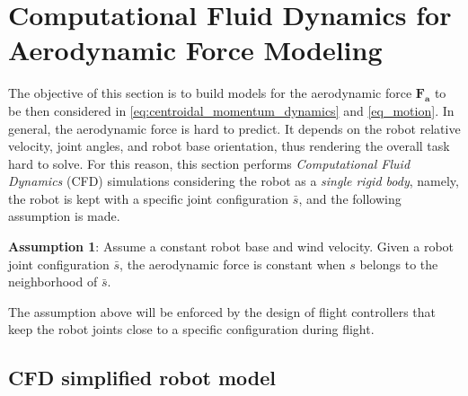 \section{Computational Fluid Dynamics for Aerodynamic Force Modeling}
\label{methods}
The objective of this section is to build models for the aerodynamic force $\boldsymbol{F_a}$ to be then considered in \eqref{eq:centroidal_momentum_dynamics} and \eqref{eq_motion}. In general, the aerodynamic force is hard to predict. It depends on the robot relative velocity, joint angles, and robot base orientation, thus rendering the overall task hard to solve. For this reason, this section performs \emph{Computational Fluid Dynamics} (CFD) simulations considering the robot as a \emph{single rigid body}, namely, the robot is kept with a specific joint configuration $\bar{s}$, and the following assumption is made.

\textbf{Assumption 1}: Assume a constant robot base and wind velocity. Given a robot joint configuration $\bar{s}$,
 the aerodynamic force is constant 
when $s$ belongs to the neighborhood of $\bar{s}$.

The assumption above will be enforced by the design of flight controllers that keep the robot joints close to a specific configuration during flight.   
  
  
\subsection{CFD simplified robot model}
\label{sec:cfdModel}
  
  
